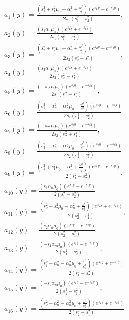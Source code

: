 \begin{align*}\tag{Aп.C. 3}\label{ap_c_def_dynamic}
    &a_1(y) = \frac{(s_1^2 + s_1^2 \mu_0 - \alpha_n^2 + \frac{\omega^2}{c_2^2}) (e^{s_1 y} - e^{-s_1 y})}{2 s_1 (s_1^2 - s_2^2)}, \\ 
    &a_2(y) = \frac{(s_1 \alpha_n \mu_0) (e^{s_1 y} + e^{-s_1 y})}{2 s_1 (s_1^2 - s_2^2)} \\
    &a_3(y) = \frac{(s_2^2 + s_2^2 \mu_0 - \alpha_n^2 + \frac{\omega^2}{c_2^2}) (e^{s_2 y} - e^{-s_2 y})}{2 s_2 (s_2^2 - s_1^2)}, \\
    &a_4(y) = \frac{(s_2 \alpha_n \mu_0) (e^{s_2 y} + e^{-s_2 y})}{2 s_2 (s_2^2 - s_1^2)} \\
    &a_5(y) = \frac{(-s_1 \alpha_n \mu_0) (e^{s_1 y} + e^{-s_1 y})}{2 s_1 (s_1^2 - s_2^2)}, \\
    &a_6(y) = \frac{(s_1^2 - \alpha_n^2 - \alpha_n^2\mu_0 + \frac{\omega^2}{c_1^2}) (e^{s_1 y} - e^{-s_1 y})}{2 s_1 (s_1^2 - s_2^2)} \\
    &a_7(y) = \frac{(-s_2 \alpha_n \mu_0) (e^{s_2 y} - e^{-s_2 y})}{2 s_2 (s_2^2 + s_1^2)}, \\
    &a_8(y) = \frac{(s_2^2 - \alpha_n^2 - \alpha_n^2\mu_0 + \frac{\omega^2}{c_1^2}) (e^{s_2 y} - e^{-s_2 y})}{2 s_2 (s_2^2 - s_1^2)} \\
    &a_9(y) = \frac{(s_1^2 + s_1^2 \mu_0 - \alpha_n^2 + \frac{\omega^2}{c_2^2}) (e^{s_1 y} + e^{-s_1 y})}{2 (s_1^2 - s_2^2)}, \\
    &a_{10}(y) = \frac{(s_1 \alpha_n \mu_0) (e^{s_1 y} - e^{-s_1 y})}{2 (s_1^2 - s_2^2)} \\
    &a_{11}(y) = \frac{(s_2^2 + s_2^2 \mu_0 - \alpha_n^2 + \frac{\omega^2}{c_2^2}) (e^{s_2 y} + e^{-s_2 y})}{2 (s_2^2 - s_1^2)}, \\ 
    &a_{12}(y) = \frac{(s_2 \alpha_n \mu_0) (e^{s_2 y} - e^{-s_2 y})}{2 (s_2^2 - s_1^2)} \\
    &a_{13}(y) = \frac{(-s_1 \alpha_n \mu_0) (e^{s_1 y} - e^{-s_1 y})}{2 (s_1^2 - s_2^2)}, \\ 
    &a_{14}(y) = \frac{(s_1^2 - \alpha_n^2 - \alpha_n^2\mu_0 + \frac{\omega^2}{c_1^2}) (e^{s_1 y} + e^{-s_1 y})}{2 (s_1^2 - s_2^2)} \\
    &a_{15}(y) = \frac{(-s_2 \alpha_n \mu_0) (e^{s_2 y} - e^{-s_2 y})}{2 (s_2^2 - s_1^2)}, \\ 
    &a_{16}(y) = \frac{(s_2^2 - \alpha_n^2 - \alpha_n^2\mu_0 + \frac{\omega^2}{c_1^2}) (e^{s_2 y} + e^{-s_2 y})}{2 (s_2^2 - s_1^2)}
\end{align*}

